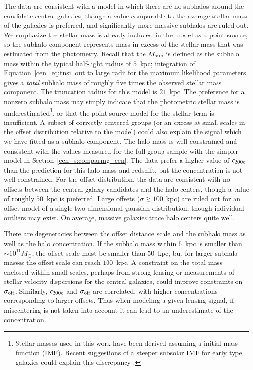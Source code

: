 The data are
consistent with a model in which there are no subhalos around the
candidate central galaxies, though a value comparable to the average
stellar mass of the galaxies is preferred, and significantly more
massive subhalos are ruled out. We emphasize the stellar mass is
already included in the model as a point source, so the subhalo
component represents mass in excess of the stellar mass that was estimated from
the photometry. Recall that the $M_{\rm sub}$ is
defined as the subhalo mass within the typical half-light radius of
$5$~{\rm kpc}; integration of Equation~\eqref{cen_eq:tnsi} out to large
radii for the maximum likelihood parameters gives a \textit{total}
subhalo mass of roughly five times the observed stellar mass component. The
truncation radius for this model is $21$~{\rm kpc}.  The preference for a nonzero subhalo
mass may simply indicate that the photometric stellar mass is
underestimated\footnote{Stellar masses used in this work have been
  derived assuming a \citet{Chabrier2003} initial mass function
  (IMF). Recent suggestions of a steeper subsolar IMF for early type galaxies
  could explain this discrepancy
  \citep[e.g.,][]{Auger2010,vanDokkum2010}.}, or that the point source
model for the stellar term is insufficient. A subset of
  correctly-centered groups (or an excess at small scales in the offset
  distribution relative to the model) could also explain the signal which we have fitted as a
  subhalo component. The halo mass is
well-constrained and consistent with the values measured for the full
group sample with the simpler model in Section~\ref{cen_s:comparing_cen}.
The data prefer a higher
value of $c_{\rm 200c}$ than the \citet{Zhao2009} prediction for this
halo mass and redshift, but the concentration is not
well-constrained. For the offset distribution, the data are consistent
with no offsets between the central galaxy candidates and the halo
centers, though a value of roughly $50$~{\rm kpc} is preferred. Large
offsets ($\sigma\gtrsim100$~{\rm kpc}) are ruled out for an offset
model of a single two-dimensional gaussian distribution, though
individual outliers may exist. On average, massive galaxies trace halo
centers quite well.

There are degeneracies between the offset distance scale and the
subhalo mass as well as the halo concentration. If the subhalo mass
within $5$~{\rm kpc} is smaller than $\sim10^{11} M_{\odot}$, the
offset scale must be smaller than $50$~{\rm kpc}, but for larger
subhalo masses the offset scale can reach $100$~{\rm kpc}. A
constraint on the total mass enclosed within small scales, perhaps
from strong lensing or measurements of stellar velocity dispersions
for the central galaxies, could improve constraints on $\sigma_{\rm
  off}$. Similarly, $c_{\rm 200c}$ and $\sigma_{\rm off}$ are
correlated, with higher concentrations corresponding to larger
offsets. Thus when modeling a given lensing signal, if miscentering is
not taken into account it can lead to an underestimate of the
concentration.


